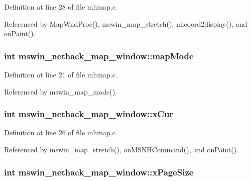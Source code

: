 Definition at line 28 of file mhmap.\+c.



Referenced by Map\+Wnd\+Proc(), mswin\+\_\+map\+\_\+stretch(), nhcoord2display(), and on\+Paint().

\hypertarget{structmswin__nethack__map__window_a75b76933790e3cc4d09c9f97df1afc1d}{
\subsubsection[{map\+Mode}]{\setlength{\rightskip}{0pt plus 5cm}int mswin\+\_\+nethack\+\_\+map\+\_\+window\+::map\+Mode}}\label{structmswin__nethack__map__window_a75b76933790e3cc4d09c9f97df1afc1d}


Definition at line 21 of file mhmap.\+c.



Referenced by mswin\+\_\+map\+\_\+mode().

\hypertarget{structmswin__nethack__map__window_aab34317edd92c7cae3930bd9ffe026c4}{
\subsubsection[{x\+Cur}]{\setlength{\rightskip}{0pt plus 5cm}int mswin\+\_\+nethack\+\_\+map\+\_\+window\+::x\+Cur}}\label{structmswin__nethack__map__window_aab34317edd92c7cae3930bd9ffe026c4}


Definition at line 26 of file mhmap.\+c.



Referenced by mswin\+\_\+map\+\_\+stretch(), on\+M\+S\+N\+H\+Command(), and on\+Paint().

\hypertarget{structmswin__nethack__map__window_abd81fd3a50efd2fe1b47b2f2a86ed0a2}{
\subsubsection[{x\+Page\+Size}]{\setlength{\rightskip}{0pt plus 5cm}int mswin\+\_\+nethack\+\_\+map\+\_\+window\+::x\+Page\+Size}}\label{structmswin__nethack__map__window_abd81fd3a50efd2fe1b47b2f2a86ed0a2}


